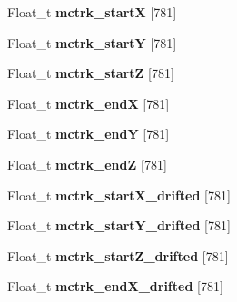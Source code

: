 \begin{DoxyCompactItemize}
\item 
\hypertarget{classanatree_a28c6d5aa320429879dab83450a47656e}{Float\-\_\-t {\bfseries mctrk\-\_\-start\-X} \mbox{[}781\mbox{]}}\label{classanatree_a28c6d5aa320429879dab83450a47656e}

\item 
\hypertarget{classanatree_a0993b873c67acc39a055188fd20ee97b}{Float\-\_\-t {\bfseries mctrk\-\_\-start\-Y} \mbox{[}781\mbox{]}}\label{classanatree_a0993b873c67acc39a055188fd20ee97b}

\item 
\hypertarget{classanatree_aa9f5ce3eae968f8b396b8348fefab6f4}{Float\-\_\-t {\bfseries mctrk\-\_\-start\-Z} \mbox{[}781\mbox{]}}\label{classanatree_aa9f5ce3eae968f8b396b8348fefab6f4}

\item 
\hypertarget{classanatree_a169d81333b8979353e0c5d21c0a446cc}{Float\-\_\-t {\bfseries mctrk\-\_\-end\-X} \mbox{[}781\mbox{]}}\label{classanatree_a169d81333b8979353e0c5d21c0a446cc}

\item 
\hypertarget{classanatree_af08d81813ea58d5c1e271052aec3207c}{Float\-\_\-t {\bfseries mctrk\-\_\-end\-Y} \mbox{[}781\mbox{]}}\label{classanatree_af08d81813ea58d5c1e271052aec3207c}

\item 
\hypertarget{classanatree_adb34bc4b4b2dcf1630a26cf1639d12b0}{Float\-\_\-t {\bfseries mctrk\-\_\-end\-Z} \mbox{[}781\mbox{]}}\label{classanatree_adb34bc4b4b2dcf1630a26cf1639d12b0}

\item 
\hypertarget{classanatree_acbec4642457f449083cd02f545e7573e}{Float\-\_\-t {\bfseries mctrk\-\_\-start\-X\-\_\-drifted} \mbox{[}781\mbox{]}}\label{classanatree_acbec4642457f449083cd02f545e7573e}

\item 
\hypertarget{classanatree_a098f06160a484ef7db9948535e597c30}{Float\-\_\-t {\bfseries mctrk\-\_\-start\-Y\-\_\-drifted} \mbox{[}781\mbox{]}}\label{classanatree_a098f06160a484ef7db9948535e597c30}

\item 
\hypertarget{classanatree_a225163f68a36ab3e3e8de0dbcb43a1d4}{Float\-\_\-t {\bfseries mctrk\-\_\-start\-Z\-\_\-drifted} \mbox{[}781\mbox{]}}\label{classanatree_a225163f68a36ab3e3e8de0dbcb43a1d4}

\item 
\hypertarget{classanatree_ab06ec24d51ea612dc94b50cb4c0a74c4}{Float\-\_\-t {\bfseries mctrk\-\_\-end\-X\-\_\-drifted} \mbox{[}781\mbox{]}}\label{classanatree_ab06ec24d51ea612dc94b50cb4c0a74c4}


\end{DoxyCompactItemize}
